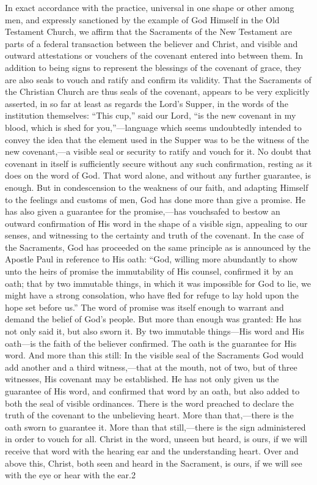 \documentclass[]{book}
\begin{document}
In exact accordance with the practice, universal in one shape or other among men, and expressly sanctioned by the example of God Himself in the Old Testament Church, we affirm that the Sacraments of the New Testament are parts of a federal transaction between the believer and Christ, and visible and outward attestations or vouchers of the covenant entered into between them. In addition to being signs to represent the blessings of the covenant of grace, they are also seals to vouch and ratify and confirm its validity. That the Sacraments of the Christian Church are thus seals of the covenant, appears to be very explicitly asserted, in so far at least as regards the Lord's Supper, in the words of the institution themselves: ``This cup,'' said our Lord, ``is the new covenant in my blood, which is shed for you,''---language which seems undoubtedly intended to convey the idea that the element used in the Supper was to be the witness of the new covenant,---a visible seal or security to ratify and vouch for it. No doubt that covenant in itself is sufficiently secure without any such confirmation, resting as it does on the word of God. That word alone, and without any further guarantee, is enough. But in condescension to the weakness of our faith, and adapting Himself to the feelings and customs of men, God has done more than give a promise. He has also given a guarantee for the promise,---has vouchsafed to bestow an outward confirmation of His word in the shape of a visible sign, appealing to our senses, and witnessing to the certainty and truth of the covenant. In the case of the Sacraments, God has proceeded on the same principle as is announced by the Apostle Paul in reference to His oath: ``God, willing more abundantly to show unto the heirs of promise the immutability of His counsel, confirmed it by an oath; that by two immutable things, in which it was impossible for God to lie, we might have a strong consolation, who have fled for refuge to lay hold upon the hope set before us.'' The word of promise was itself enough to warrant and demand the belief of God's people. But more than enough was granted: He has not only said it, but also sworn it. By two immutable things---His word and His oath---is the faith of the believer confirmed. The oath is the guarantee for His word. And more than this still: In the visible seal of the Sacraments God would add another and a third witness,---that at the mouth, not of two, but of three witnesses, His covenant may be established. He has not only given us the guarantee of His word, and confirmed that word by an oath, but also added to both the seal of visible ordinances. There is the word preached to declare the truth of the covenant to the unbelieving heart. More than that,---there is the oath sworn to guarantee it. More than that still,---there is the sign administered in order to vouch for all. Christ in the word, unseen but heard, is ours, if we will receive that word with the hearing ear and the understanding heart. Over and above this, Christ, both seen and heard in the Sacrament, is ours, if we will see with the eye or hear with the ear.2
\end{document}
